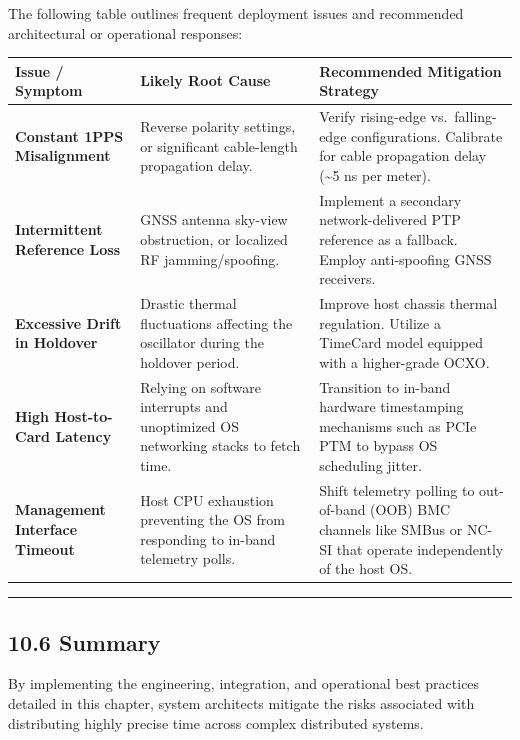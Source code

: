 \documentclass[
]{article}
\newcounter{none} %
\begin{document}
The following table outlines frequent deployment issues and recommended
architectural or operational responses:

{\def\LTcaptype{none} %
\begin{longtable}[]{@{}
  >{\raggedright\arraybackslash}p{}
  >{\raggedright\arraybackslash}p{}
  >{\raggedright\arraybackslash}p{}@{}}
\toprule\noalign{}
Issue / Symptom & Likely Root Cause & Recommended Mitigation Strategy \\
\midrule\noalign{}
\endhead
\bottomrule\noalign{}
\endlastfoot
\textbf{Constant 1PPS Misalignment} & Reverse polarity settings, or
significant cable-length propagation delay. & Verify rising-edge
vs.~falling-edge configurations. Calibrate for cable propagation delay
(\textasciitilde5 ns per meter). \\
\textbf{Intermittent Reference Loss} & GNSS antenna sky-view
obstruction, or localized RF jamming/spoofing. & Implement a secondary
network-delivered PTP reference as a fallback. Employ anti-spoofing GNSS
receivers. \\
\textbf{Excessive Drift in Holdover} & Drastic thermal fluctuations
affecting the oscillator during the holdover period. & Improve host
chassis thermal regulation. Utilize a TimeCard model equipped with a
higher-grade OCXO. \\
\textbf{High Host-to-Card Latency} & Relying on software interrupts and
unoptimized OS networking stacks to fetch time. & Transition to in-band
hardware timestamping mechanisms such as PCIe PTM to bypass OS
scheduling jitter. \\
\textbf{Management Interface Timeout} & Host CPU exhaustion preventing
the OS from responding to in-band telemetry polls. & Shift telemetry
polling to out-of-band (OOB) BMC channels like SMBus or NC-SI that
operate independently of the host OS. \\
\end{longtable}
}

\begin{center}\rule{0.5\linewidth}{0.5pt}\end{center}

\subsection{10.6 Summary}\label{summary-2}

By implementing the engineering, integration, and operational best
practices detailed in this chapter, system architects mitigate the risks
associated with distributing highly precise time across complex
distributed systems.
\end{document}
